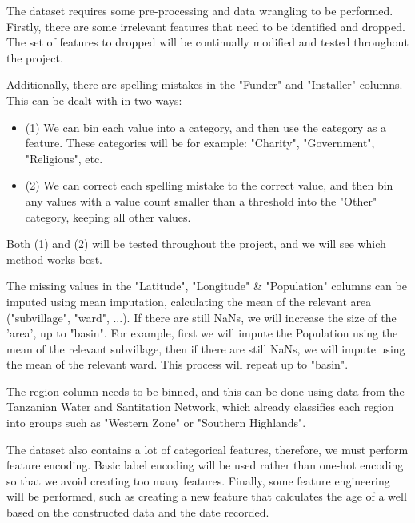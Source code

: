 \documentclass{article}
\begin{document}
The dataset requires some pre-processing and data wrangling to be performed. Firstly, there are some irrelevant features that need to be identified and dropped. The set of features to dropped will be continually modified and tested throughout the project.

Additionally, there are spelling mistakes in the "Funder" and "Installer" columns. This can be dealt with in two ways:
    \begin{itemize}
        \item (1) We can bin each value into a category, and then use the category as a feature. These categories will be for example: "Charity", "Government", "Religious", etc.
        \item (2) We can correct each spelling mistake to the correct value, and then bin any values with a value count smaller than a threshold into the "Other" category, keeping all other values.
    \end{itemize}

Both (1) and (2) will be tested throughout the project, and we will see which method works best. 


The missing values in the "Latitude", "Longitude" \& "Population" columns can be imputed using mean imputation, calculating the mean of the relevant area ("subvillage", "ward", ...). If there are still NaNs, we will increase the size of the 'area', up to "basin". For example, first we will impute the Population using the mean of the relevant subvillage, then if there are still NaNs, we will impute using the mean of the relevant ward. This process will repeat up to "basin".

The region column needs to be binned, and this can be done using data from the Tanzanian Water and Santitation Network, which already classifies each region into groups such as "Western Zone" or "Southern Highlands".

The dataset also contains a lot of categorical features, therefore, we must perform feature encoding. Basic label encoding will be used rather than one-hot encoding so that we avoid creating too many features. Finally, some feature engineering will be performed, such as creating a new feature that calculates the age of a well based on the constructed data and the date recorded.
\end{document}
